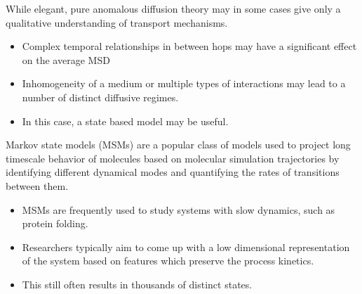 \documentclass{article}
\begin{document}
  While elegant, pure anomalous diffusion theory may in some cases give only a qualitative
  understanding of transport mechanisms.
  \begin{itemize}
    \item Complex temporal relationships in between hops may have a significant effect on the average MSD
    \item Inhomogeneity of a medium or multiple types of interactions may lead to a number of
    distinct diffusive regimes. 
    \item In this case, a state based model may be useful. 
  \end{itemize}
  

  Markov state models (MSMs) are a popular class of models used to project long timescale
  behavior of molecules based on molecular simulation trajectories by identifying
  different dynamical modes and quantifying the rates of transitions between them.
  \begin{itemize}
    \item MSMs are frequently used to study systems with slow dynamics, such as protein 
    folding.~\cite{snow_how_2005,chodera_automatic_2007}
    \item Researchers typically aim to come up with a low dimensional 
    representation of the system based on features which preserve the process
    kinetics.
    \item This still often results in thousands of distinct states. 
  \end{itemize}

  
\end{document}
